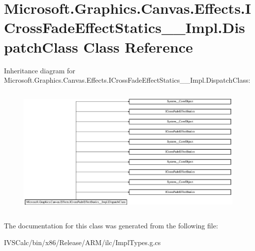 \hypertarget{class_microsoft_1_1_graphics_1_1_canvas_1_1_effects_1_1_i_cross_fade_effect_statics_____impl_1_1_dispatch_class}{}\section{Microsoft.\+Graphics.\+Canvas.\+Effects.\+I\+Cross\+Fade\+Effect\+Statics\+\_\+\+\_\+\+Impl.\+Dispatch\+Class Class Reference}
\label{class_microsoft_1_1_graphics_1_1_canvas_1_1_effects_1_1_i_cross_fade_effect_statics_____impl_1_1_dispatch_class}
Inheritance diagram for Microsoft.\+Graphics.\+Canvas.\+Effects.\+I\+Cross\+Fade\+Effect\+Statics\+\_\+\+\_\+\+Impl.\+Dispatch\+Class\+:\begin{figure}[H]
\begin{center}
\leavevmode
\includegraphics[height=6.457023cm]{class_microsoft_1_1_graphics_1_1_canvas_1_1_effects_1_1_i_cross_fade_effect_statics_____impl_1_1_dispatch_class}
\end{center}
\end{figure}


The documentation for this class was generated from the following file\+:\begin{DoxyCompactItemize}
\item 
I\+V\+S\+Calc/bin/x86/\+Release/\+A\+R\+M/ilc/Impl\+Types.\+g.\+cs\end{DoxyCompactItemize}
